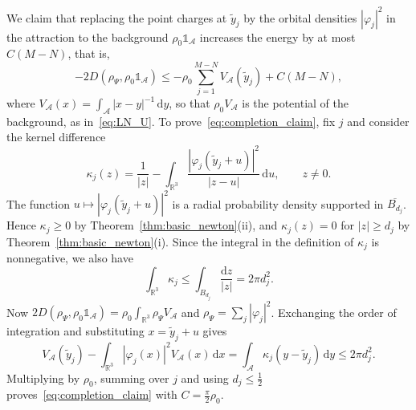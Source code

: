 \documentclass[final,reqno]{amsart}
\theoremstyle{remark}
\theoremstyle{definition}
\renewcommand{\le}{\leqslant}
\renewcommand{\ge}{\geqslant}
\newcommand{\RR}{\mathbb{R}}
\newcommand{\iden}{\mathbb{1}}
\begin{document}
We claim that replacing the point charges at $\tilde y_j$ by the orbital densities $|\varphi_j|^2$ in the attraction to the background $\rho_0\iden_{\mathcal A}$ increases the energy by at most $C(M-N)$, that is,
\begin{equation}\label{eq:completion_claim}
-2D(\rho_\Psi,\rho_0\iden_{\mathcal A})
\le-\rho_0\sum_{j=1}^{M-N}V_{\mathcal A}(\tilde y_j)+C(M-N),
\end{equation}
where $V_{\mathcal A}(x)=\int_{\mathcal A}|x-y|^{-1}\,\mathrm dy$, so that $\rho_0V_{\mathcal A}$ is the potential of the background, as in~\eqref{eq:LN_U}. To prove~\eqref{eq:completion_claim}, fix $j$ and consider the kernel difference
\[
\kappa_j(z)=\frac1{|z|}-\int_{\RR^3}\frac{|\varphi_j(\tilde y_j+u)|^2}{|z-u|}\,\mathrm du,\qquad z\ne0.
\]
The function $u\mapsto|\varphi_j(\tilde y_j+u)|^2$ is a radial probability density supported in $\overline{B_{d_j}}$. Hence $\kappa_j\ge0$ by Theorem~\ref{thm:basic_newton}(ii), and $\kappa_j(z)=0$ for $|z|\ge d_j$ by Theorem~\ref{thm:basic_newton}(i). Since the integral in the definition of $\kappa_j$ is nonnegative, we also have
\[
\int_{\RR^3}\kappa_j\le\int_{B_{d_j}}\frac{\mathrm dz}{|z|}=2\pi d_j^2.
\]
Now $2D(\rho_\Psi,\rho_0\iden_{\mathcal A})=\rho_0\int_{\RR^3}\rho_\Psi V_{\mathcal A}$ and $\rho_\Psi=\sum_j|\varphi_j|^2$. Exchanging the order of integration and substituting $x=\tilde y_j+u$ gives
\[
V_{\mathcal A}(\tilde y_j)-\int_{\RR^3}|\varphi_j(x)|^2V_{\mathcal A}(x)\,\mathrm dx
=\int_{\mathcal A}\kappa_j(y-\tilde y_j)\,\mathrm dy
\le2\pi d_j^2.
\]
Multiplying by $\rho_0$, summing over $j$ and using $d_j\le\frac12$ proves~\eqref{eq:completion_claim} with $C=\frac\pi2\rho_0$.

\medskip
\end{document}
